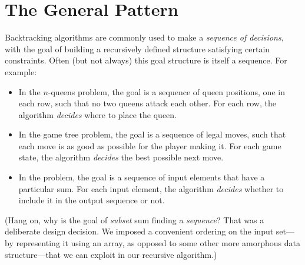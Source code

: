 \section{The General Pattern}
\label{sec:2.4}

Backtracking algorithms are commonly used to make a \textit{sequence of decisions}, with the goal of building a recursively defined structure satisfying certain constraints.
Often (but not always) this goal structure is itself a sequence.
For example:
\begin{itemize}
\item In the $n$-queens problem, the goal is a sequence of queen positions, one in each row, such that no two queens attack each other.
For each row, the algorithm \textit{decides} where to place the queen.
\item In the game tree problem, the goal is a sequence of legal moves, such that each move is as good as possible for the player making it.
For each game state, the algorithm \textit{decides} the best possible next move.
\item In the  problem, the goal is a sequence of input elements that have a particular sum.
For each input element, the algorithm \textit{decides} whether to include it in the output sequence or not.
\end{itemize}
(Hang on, why is the goal of \textit{subset} sum finding a \textit{sequence}?
That was a deliberate design decision.
We imposed a convenient ordering on the input set---by representing it using an array, as opposed to some other more amorphous data structure---that we can exploit in our recursive algorithm.)

